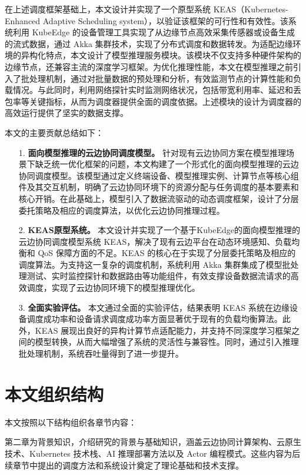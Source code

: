 在上述调度框架基础上，本文设计并实现了一个原型系统 KEAS（Kubernetes-Enhanced Adaptive Scheduling system），以验证该框架的可行性和有效性。该系统利用 KubeEdge 的设备管理工具实现了从边缘节点高效采集传感器或设备生成的流式数据，通过 Akka 集群技术，实现了分布式调度和数据转发。为适配边缘环境的异构化特点，本文设计了模型推理服务模块。该模块不仅支持多种硬件架构的边缘节点，还兼容主流的深度学习框架。为优化推理性能，本文在模型推理之前引入了批处理机制，通过对批量数据的预处理和分析，有效监测节点的计算性能和负载情况。与此同时，利用网络探针实时监测网络状况，包括带宽利用率、延迟和丢包率等关键指标，从而为调度器提供全面的调度依据。上述模块的设计为调度器的高效运行提供了坚实的数据支撑。

本文的主要贡献总结如下：

\begin{enumerate}
    \item[1.] \textbf{面向模型推理的云边协同调度模型。} 针对现有云边协同方案在模型推理场景下缺乏统一优化框架的问题，本文构建了一个形式化的面向模型推理的云边协同调度模型。该模型通过定义终端设备、模型推理实例、计算节点等核心组件及其交互机制，明确了云边协同环境下的资源分配与任务调度的基本要素和核心开销。在此基础上，模型引入了数据流驱动的动态调度框架，设计了分层委托策略及相应的调度算法，以优化云边协同推理过程。
    \item[2.] \textbf{KEAS原型系统。} 本文设计并实现了一个基于KubeEdge的面向模型推理的云边协同调度模型系统 KEAS，解决了现有云边平台在动态环境感知、负载均衡和 QoS 保障方面的不足。KEAS 的核心在于实现了分层委托策略及相应的调度算法。为支持这一复杂的调度机制，系统利用 Akka 集群集成了模型批处理测试、实时监控探针和数据路由等功能组件，有效支撑设备数据流请求的高效调度，实现了云边协同环境下的模型推理优化。
    \item[3.] \textbf{全面实验评估。} 本文通过全面的实验评估，结果表明 KEAS 系统在边缘设备调度成功率和设备请求调度成功率方面显著优于现有的负载均衡算法。此外，KEAS 展现出良好的异构计算节点适配能力，并支持不同深度学习框架之间的模型转换，从而大幅增强了系统的灵活性与兼容性。同时，通过引入推理批处理机制，系统吞吐量得到了进一步提升。
\end{enumerate}

\section{本文组织结构}

本文按照以下结构组织各章节内容：

第二章为背景知识，介绍研究的背景与基础知识，涵盖云边协同计算架构、云原生技术、Kubernetes 技术栈、AI 推理部署方法以及 Actor 编程模式。这些内容为后续章节中提出的调度方法和系统设计奠定了理论基础和技术支撑。

